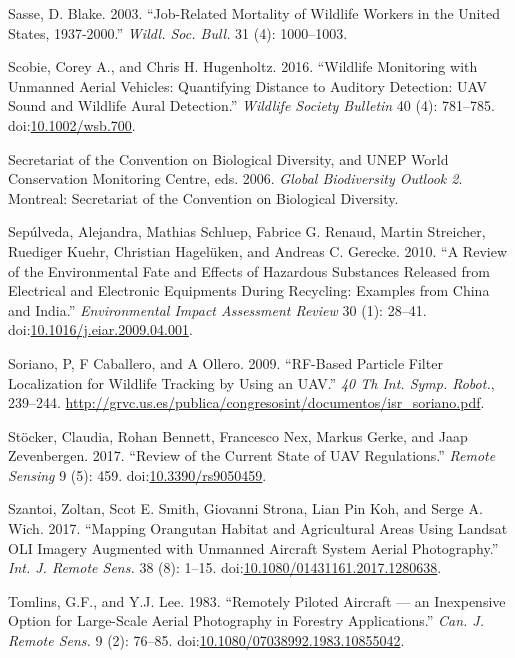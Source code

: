 \documentclass[]{interact}
\theoremstyle{plain}%
\theoremstyle{definition}
\theoremstyle{remark}
\begin{document}
\hypertarget{ref-sasse_job-related_2003}{}
Sasse, D. Blake. 2003. ``Job-Related Mortality of Wildlife Workers in
the United States, 1937-2000.'' \emph{Wildl. Soc. Bull.} 31 (4):
1000--1003.

\hypertarget{ref-scobie_wildlife_2016}{}
Scobie, Corey A., and Chris H. Hugenholtz. 2016. ``Wildlife Monitoring
with Unmanned Aerial Vehicles: Quantifying Distance to Auditory
Detection: UAV Sound and Wildlife Aural Detection.'' \emph{Wildlife
Society Bulletin} 40 (4): 781--785.
doi:\href{https://doi.org/10.1002/wsb.700}{10.1002/wsb.700}.

\hypertarget{ref-secretariat_of_the_convention_on_biological_diversity_global_2006}{}
Secretariat of the Convention on Biological Diversity, and UNEP World
Conservation Monitoring Centre, eds. 2006. \emph{Global Biodiversity
Outlook 2}. Montreal: Secretariat of the Convention on Biological
Diversity.

\hypertarget{ref-sepulveda_review_2010}{}
Sepúlveda, Alejandra, Mathias Schluep, Fabrice G. Renaud, Martin
Streicher, Ruediger Kuehr, Christian Hagelüken, and Andreas C. Gerecke.
2010. ``A Review of the Environmental Fate and Effects of Hazardous
Substances Released from Electrical and Electronic Equipments During
Recycling: Examples from China and India.'' \emph{Environmental Impact
Assessment Review} 30 (1): 28--41.
doi:\href{https://doi.org/10.1016/j.eiar.2009.04.001}{10.1016/j.eiar.2009.04.001}.

\hypertarget{ref-soriano_rf-based_2009}{}
Soriano, P, F Caballero, and A Ollero. 2009. ``RF-Based Particle Filter
Localization for Wildlife Tracking by Using an UAV.'' \emph{40 Th Int.
Symp. Robot.}, 239--244.
\url{http://grvc.us.es/publica/congresosint/documentos/isr_soriano.pdf}.

\hypertarget{ref-stocker_review_2017}{}
Stöcker, Claudia, Rohan Bennett, Francesco Nex, Markus Gerke, and Jaap
Zevenbergen. 2017. ``Review of the Current State of UAV Regulations.''
\emph{Remote Sensing} 9 (5): 459.
doi:\href{https://doi.org/10.3390/rs9050459}{10.3390/rs9050459}.

\hypertarget{ref-szantoi_mapping_2017}{}
Szantoi, Zoltan, Scot E. Smith, Giovanni Strona, Lian Pin Koh, and Serge
A. Wich. 2017. ``Mapping Orangutan Habitat and Agricultural Areas Using
Landsat OLI Imagery Augmented with Unmanned Aircraft System Aerial
Photography.'' \emph{Int. J. Remote Sens.} 38 (8): 1--15.
doi:\href{https://doi.org/10.1080/01431161.2017.1280638}{10.1080/01431161.2017.1280638}.

\hypertarget{ref-tomlins_remotely_1983}{}
Tomlins, G.F., and Y.J. Lee. 1983. ``Remotely Piloted Aircraft --- an
Inexpensive Option for Large-Scale Aerial Photography in Forestry
Applications.'' \emph{Can. J. Remote Sens.} 9 (2): 76--85.
doi:\href{https://doi.org/10.1080/07038992.1983.10855042}{10.1080/07038992.1983.10855042}.
\end{document}
